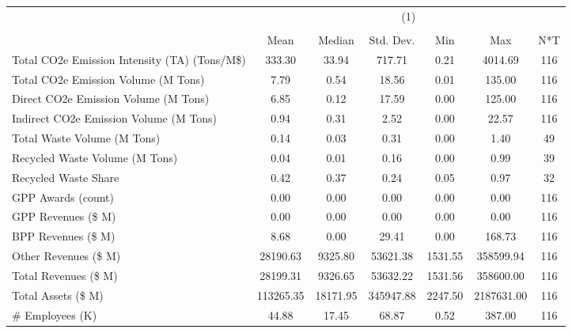 {
\def\sym#1{\ifmmode^{#1}\else\(^{#1}\)\fi}
\begin{tabular}{l*{1}{cccccc}}
\hline\hline
                    &\multicolumn{6}{c}{(1)}                                                      \\
                    &\multicolumn{6}{c}{}                                                         \\
                    &        Mean&      Median&   Std. Dev.&         Min&         Max&         N*T\\
\hline
Total CO2e Emission Intensity (TA) (Tons/M\$)&      333.30&       33.94&      717.71&        0.21&     4014.69&         116\\
Total CO2e Emission Volume (M Tons)&        7.79&        0.54&       18.56&        0.01&      135.00&         116\\
Direct CO2e Emission Volume (M Tons)&        6.85&        0.12&       17.59&        0.00&      125.00&         116\\
Indirect CO2e Emission Volume (M Tons)&        0.94&        0.31&        2.52&        0.00&       22.57&         116\\
Total Waste Volume (M Tons)&        0.14&        0.03&        0.31&        0.00&        1.40&          49\\
Recycled Waste Volume (M Tons)&        0.04&        0.01&        0.16&        0.00&        0.99&          39\\
Recycled Waste Share&        0.42&        0.37&        0.24&        0.05&        0.97&          32\\
GPP Awards (count)  &        0.00&        0.00&        0.00&        0.00&        0.00&         116\\
GPP Revenues (\$ M) &        0.00&        0.00&        0.00&        0.00&        0.00&         116\\
BPP Revenues (\$ M) &        8.68&        0.00&       29.41&        0.00&      168.73&         116\\
Other Revenues (\$ M)&    28190.63&     9325.80&    53621.38&     1531.55&   358599.94&         116\\
Total Revenues (\$ M)&    28199.31&     9326.65&    53632.22&     1531.56&   358600.00&         116\\
Total Assets (\$ M) &   113265.35&    18171.95&   345947.88&     2247.50&  2187631.00&         116\\
\# Employees (K)    &       44.88&       17.45&       68.87&        0.52&      387.00&         116\\

\end{tabular}}
